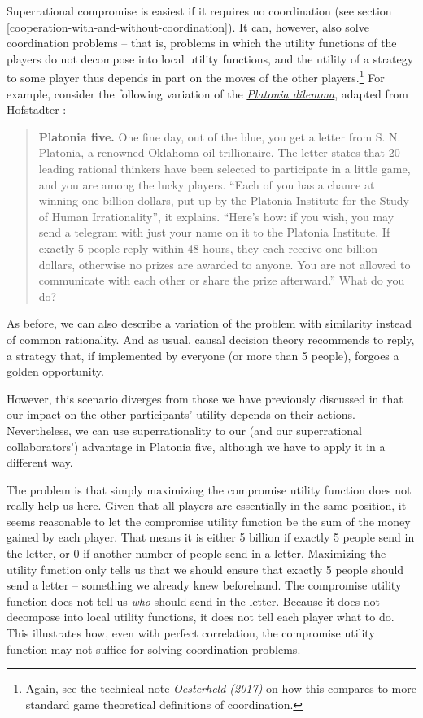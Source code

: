 Superrational compromise is easiest if it requires no coordination (see
section
\ref{cooperation-with-and-without-coordination}). It can, however, also solve
coordination problems -- that is, problems in which the utility
functions of the players do not decompose into local utility functions,
and the utility of a strategy to some player thus depends in part on the
moves of the other players.\footnote{Again, see the technical note
  \href{https://casparoesterheld.files.wordpress.com/2017/03/technicalnoteoncgs.pdf}{\emph{Oesterheld
  (2017)}} on how this compares to more standard game theoretical
  definitions of coordination.} For example, consider the following
variation of the
\href{https://en.wikipedia.org/wiki/Platonia_dilemma}{\emph{Platonia
dilemma}}, adapted from Hofstadter \parencite{Hofstadter1983-az}:

\begin{quote}
\textbf{Platonia five.} One fine day, out of the blue, you get a letter
from S. N. Platonia, a renowned Oklahoma oil trillionaire. The letter
states that 20 leading rational thinkers have been selected to
participate in a little game, and you are among the lucky players.
``Each of you has a chance at winning one billion dollars, put up by the
Platonia Institute for the Study of Human Irrationality'', it explains.
``Here's how: if you wish, you may send a telegram with just your name
on it to the Platonia Institute. If exactly 5 people reply within 48
hours, they each receive one billion dollars, otherwise no prizes are
awarded to anyone. You are not allowed to communicate with each other or
share the prize afterward.'' What do you do?
\end{quote}

As before, we can also describe a variation of the problem with
similarity instead of common rationality. And as usual, causal decision
theory recommends to reply, a strategy that, if implemented by everyone
(or more than 5 people), forgoes a golden opportunity.

However, this scenario diverges from those we have previously discussed
in that our impact on the other participants' utility depends on their
actions. Nevertheless, we can use superrationality to our (and our
superrational collaborators') advantage in Platonia five, although we
have to apply it in a different way.

The problem is that simply maximizing the compromise utility function
does not really help us here. Given that all players are essentially in
the same position, it seems reasonable to let the compromise utility
function be the sum of the money gained by each player. That means it is
either 5 billion if exactly 5 people send in the letter, or 0 if another
number of people send in a letter. Maximizing the utility function only
tells us that we should ensure that exactly 5 people should send a
letter -- something we already knew beforehand. The compromise utility
function does not tell us \emph{who} should send in the letter. Because
it does not decompose into local utility functions, it does not tell
each player what to do. This illustrates how, even with perfect
correlation, the compromise utility function may not suffice for solving
coordination problems.

